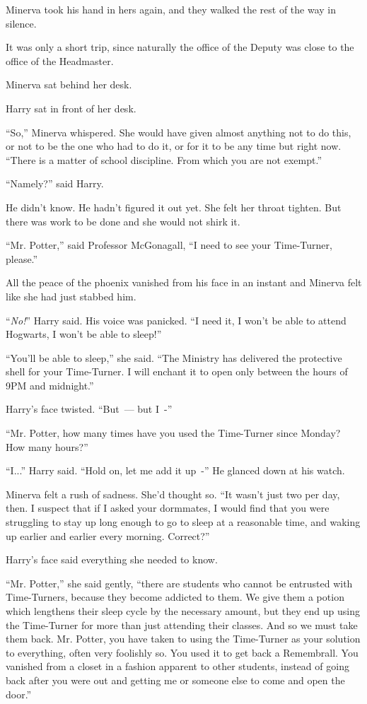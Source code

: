 Minerva took his hand in hers again, and they walked the rest of the way in silence.

It was only a short trip, since naturally the office of the Deputy was close to the office of the Headmaster.

Minerva sat behind her desk.

Harry sat in front of her desk.

``So,'' Minerva whispered. She would have given almost anything not to do this, or not to be the one who had to do it, or for it to be any time but right now. ``There is a matter of school discipline. From which you are not exempt.''

``Namely?'' said Harry.

He didn't know. He hadn't figured it out yet. She felt her throat tighten. But there was work to be done and she would not shirk it.

``Mr. Potter,'' said Professor McGonagall, ``I need to see your Time-Turner, please.''

All the peace of the phoenix vanished from his face in an instant and Minerva felt like she had just stabbed him.

``\emph{No!}'' Harry said. His voice was panicked. ``I need it, I won't be able to attend Hogwarts, I won't be able to sleep!''

``You'll be able to sleep,'' she said. ``The Ministry has delivered the protective shell for your Time-Turner. I will enchant it to open only between the hours of 9PM and midnight.''

Harry's face twisted. ``But~--- but I~-''

``Mr. Potter, how many times have you used the Time-Turner since Monday? How many hours?''

``I...'' Harry said. ``Hold on, let me add it up~-'' He glanced down at his watch.

Minerva felt a rush of sadness. She'd thought so. ``It wasn't just two per day, then. I suspect that if I asked your dormmates, I would find that you were struggling to stay up long enough to go to sleep at a reasonable time, and waking up earlier and earlier every morning. Correct?''

Harry's face said everything she needed to know.

``Mr. Potter,'' she said gently, ``there are students who cannot be entrusted with Time-Turners, because they become addicted to them. We give them a potion which lengthens their sleep cycle by the necessary amount, but they end up using the Time-Turner for more than just attending their classes. And so we must take them back. Mr. Potter, you have taken to using the Time-Turner as your solution to everything, often very foolishly so. You used it to get back a Remembrall. You vanished from a closet in a fashion apparent to other students, instead of going back after you were out and getting me or someone else to come and open the door.''

